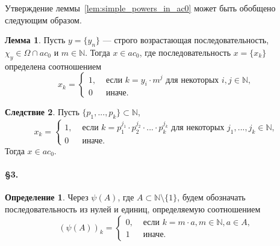 \documentclass[a4paper,openbib]{article}
\theoremstyle{definition}
\newtheorem{lemma}{Лемма}
\newtheorem{definition}{Определение}
\newtheorem{corollary}[lemma]{Следствие}
\begin{document}
Утверждение леммы~\ref{lem:simple_powers_in_ac0} может быть обобщено следующим образом.

\begin{lemma}
	Пусть $y = \{y_n\}$ --- строго возрастающая последовательность,
	$\chi_y\in\Omega \cap ac_0$ и
	$m \in \mathbb{N}$.
	Тогда $x\in ac_0$, где последовательность $x=\{x_k\}$ определена соотношением
	\begin{equation}
		x_k = \begin{cases}
			1, &\mbox{~если~} k = y_i \cdot m^j \mbox{~для некоторых~} i,j\in\mathbb{N},
			\\
			0  &\mbox{~иначе}
			.
		\end{cases}
	\end{equation}
\end{lemma}


\begin{corollary}
	\label{cor:ac0_powers_finite_set_of_numbers}
	Пусть $\{p_1, ..., p_k\} \subset \mathbb{N}$,
	\begin{equation}
		x_k = \begin{cases}
			1, &\mbox{~если~} k = p_1^{j_1}\cdot p_2^{j_2}\cdot ... \cdot p_k^{j_k} \mbox{~для некоторых~} j_1,...,j_k\in\mathbb{N},
			\\
			0  &\mbox{~иначе}.
		\end{cases}
	\end{equation}
	Тогда $x\in ac_0$.
\end{corollary}

\paragraph{\S 3.}


\begin{definition}
	Через $\psi(A)$, где $A\subset\mathbb{N}\setminus\{1\}$,
	будем обозначать последовательность из нулей и единиц,
	определяемую соотношением
	\begin{equation}
		(\psi(A))_k = \begin{cases}
			0, & \mbox{~если~} k = m\cdot a, m \in \mathbb{N}, a\in A,
			\\
			1  & \mbox{~иначе.}
		\end{cases}
	\end{equation}
\end{definition}
\end{document}
